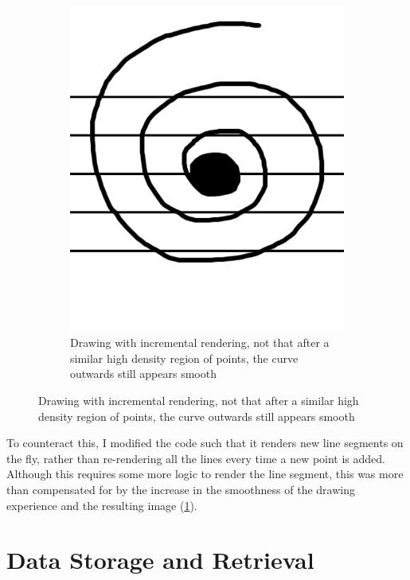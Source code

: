 \begin{figure}[hbt                                   ]
\begin{subfigure}[b]{.49\linewidth}
      \includegraphics[width=\linewidth]{gfx/implementation/nolag-stave.png}
      \caption{Drawing with incremental rendering, not that after a similar high density region of points, the curve outwards still appears smooth}
      \label{fig:drawing-lag-smooth}
    \end{subfigure}
    
  \label{Drawing Lag}
    
\end{figure}

To counteract this, I modified the code such that it renders new line segments on the fly, rather than re-rendering all the lines every time a new point is added. Although this requires some more logic to render the line segment, this was more than compensated for by the increase in the smoothness of the drawing experience and the resulting image (\cref{fig:drawing-lag-smooth}).

\section{Data Storage and Retrieval}

